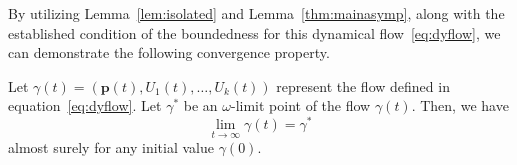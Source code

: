\documentclass[onefignum,onetabnum]{siamart220329}
\begin{document}
{    By utilizing Lemma~\ref{lem:isolated} and Lemma~\ref{thm:mainasymp}, along with the established condition of the boundedness for this dynamical flow~\eqref{eq:dyflow}, we can demonstrate the following convergence property.  
    \begin{theorem}\label{thm:mainasymp0} 
    Let $\gamma(t) = (\mathbf{p}(t), U_1(t), \ldots, U_k(t))$ represent the flow defined in equation~\eqref{eq:dyflow}. Let $\gamma^*$ be an $\omega$-limit point of the flow $\gamma(t)$. Then, we have 
    \begin{equation} \label{eq:mainsaymp}
    \lim\limits_{t\rightarrow \infty} \gamma(t) = \gamma^*
    \end{equation}
    almost surely for any initial value $\gamma(0)$.
    \end{theorem}
    
    
    
    }
    
     
    
    
    
\end{document}
